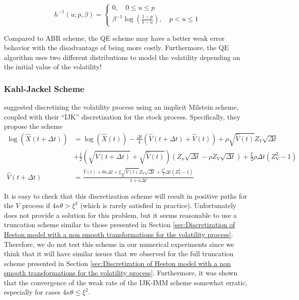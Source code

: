 \begin{enumerate}
\begin{enumerate}
 \[
    h^{-1}(u; p,\beta)=\left\{
                \begin{array}{ll}
                  0, \quad  0 \le u \le p\\
                   \beta^{-1} \log\left(\frac{1-p}{1-u}\right), \quad  p< u \le 1
                \end{array}
              \right.
  \]
\end{enumerate}
\end{enumerate}

Compared to ABR scheme, the QE scheme may have a better weak error behavior with the disadvantage of being more costly. Furthermore, the QE algorithm uses two different distributions to model the volatility depending on the initial value of the volatility!
\subsubsection{Kahl-Jackel Scheme}
\cite{kahl2006fast} suggested discretizing the volatility process using an implicit Milstein scheme, coupled with their “IJK” discretization for the stock process. Specifically, they propose the scheme
\begin{align}
\log(\hat{X}(t+\Delta t))&=\log(\hat{X}(t))-\frac{\Delta t}{4} \left(\hat{V}(t+\Delta t)+ \hat{V}(t) \right) +\rho \sqrt{\hat{V}(t)} Z_V \sqrt{\Delta t}  \nonumber\\
& +\frac{1}{2} \left(\sqrt{\hat{V}(t+\Delta t)}+ \sqrt{\hat{V}(t)} \right) \left(Z_x \sqrt{\Delta t}- \rho Z_V \sqrt{\Delta t}  \right) +\frac{\xi}{2} \rho  \Delta t (Z_V^2-1) \nonumber\\
 \hat{V}(t+\Delta t)&=\frac{\hat{V}(t)+\theta \kappa \Delta t+\xi \sqrt{\hat{V}(t)} Z_V \sqrt{\Delta t} +\frac{\xi^2}{4} \Delta t (Z_V^2-1) }{1+ \kappa \Delta t }
\end{align}

It is easy to check that this discretization scheme will result in positive paths for the $V$ process if $4 \kappa \theta >\xi^2$ (which is rarely satisfied in practice). Unfortunately \cite{kahl2006fast} does not provide a solution for this problem, but it seems reasonable to use a truncation scheme similar to those presented in Section \ref{sec:Discretization of Heston model with a non smooth transformations for the volatility process}.  Therefore, we do not test this scheme in our numerical experiments since we think that it will have similar issues that we observed for the full truncation scheme presented in Section \ref{sec:Discretization of Heston model with a non smooth transformations for the volatility process}. Furthermore, it was shown that the convergence of the weak rate of the IJK-IMM scheme  somewhat erratic, especially for cases  $4 \kappa \theta \le \xi^2$.

